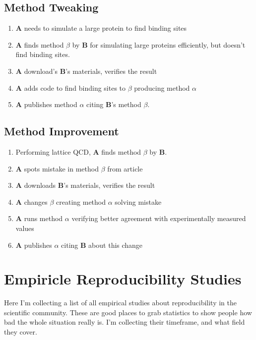 \documentclass{article}
\begin{document}
\subsection{Method Tweaking}

\begin{enumerate}
\item \textbf{A} needs to simulate a large protein to find binding sites
\item \textbf{A} finds method \boldmath$\beta$ by \textbf{B} for simulating large proteins efficiently, but doesn't find binding sites.
\item \textbf{A} download's \textbf{B}'s materials, verifies the result
\item \textbf{A} adds code to find binding sites to $\beta$ producing method $\alpha$
\item \textbf{A} publishes method $\alpha$ citing \textbf{B}'s method $\beta$.
\end{enumerate}

\subsection{Method Improvement}

\begin{enumerate}
\item Performing lattice QCD, \textbf{A} finds method \boldmath$\beta$ by \textbf{B}.
\item \textbf{A} spots mistake in method $\beta$ from article
\item \textbf{A} downloads \textbf{B}'s materials, verifies the result
\item \textbf{A} changes $\beta$ creating method $\alpha$ solving mistake
\item \textbf{A} runs method $\alpha$ verifying better agreement with experimentally measured values
\item \textbf{A} publishes $\alpha$ citing \textbf{B} about this change
\end{enumerate}

\section{Empiricle Reproducibility Studies}

Here I'm collecting a list of all empirical studies about reproducibility in the scientific community. These are good places to grab statistics to show people how bad the whole situation really is. I'm collecting their timeframe, and what field they cover.
\end{document}
